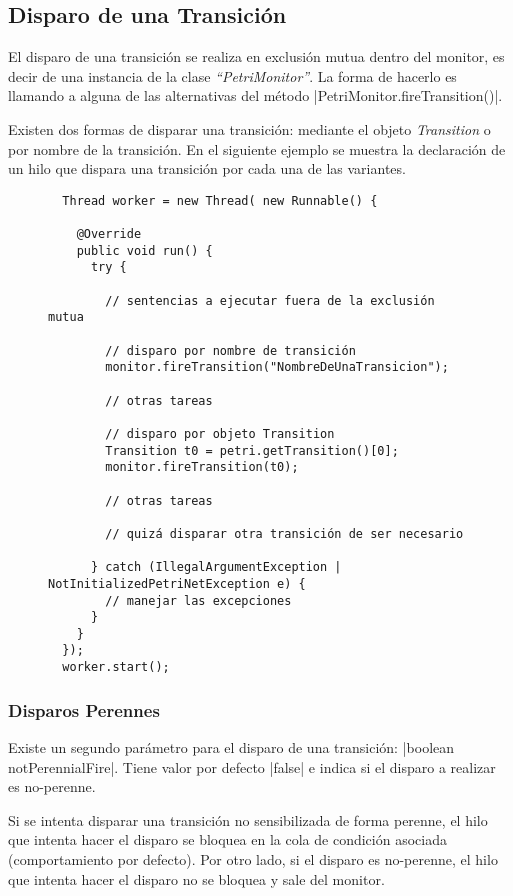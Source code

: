 \subsection{Disparo de una Transición}

El disparo de una transición se realiza en exclusión mutua dentro del monitor,
es decir de una instancia de la clase \textit{``PetriMonitor''}. La forma de
hacerlo es llamando a alguna de las alternativas del método
|PetriMonitor.fireTransition()|.

Existen dos formas de disparar una transición: mediante el objeto
\textit{Transition} o por nombre de la transición.
En el siguiente ejemplo se muestra la declaración de un hilo que dispara una
transición por cada una de las variantes.

\begin{figure}[H]
\centering
\begin{verbatim}
  Thread worker = new Thread( new Runnable() {
  
    @Override
    public void run() {
      try {
      
        // sentencias a ejecutar fuera de la exclusión mutua

        // disparo por nombre de transición
        monitor.fireTransition("NombreDeUnaTransicion");

        // otras tareas

        // disparo por objeto Transition
        Transition t0 = petri.getTransition()[0];
        monitor.fireTransition(t0);
      
        // otras tareas
      
        // quizá disparar otra transición de ser necesario

      } catch (IllegalArgumentException | NotInitializedPetriNetException e) {
        // manejar las excepciones
      }
    }
  });
  worker.start();
\end{verbatim}
\end{figure}

\subsubsection*{Disparos Perennes}
\label{disparos_perennes}
Existe un segundo parámetro para el disparo de una transición: 
|boolean notPerennialFire|. Tiene valor por defecto
|false| e indica si el disparo a realizar es no-perenne.

Si se intenta disparar una transición no sensibilizada de forma perenne, el hilo
que intenta hacer el disparo se bloquea en la cola de condición asociada
(comportamiento por defecto). Por otro lado, si el disparo es no-perenne, el
hilo que intenta hacer el disparo no se bloquea y sale del monitor.


